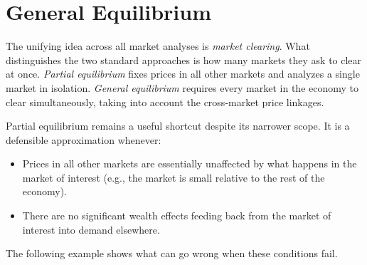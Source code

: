 \chapter{General Equilibrium}

The unifying idea across all market analyses is \emph{market clearing}.
What distinguishes the two standard approaches is how many markets
they ask to clear at once. \emph{Partial equilibrium} fixes prices in
all other markets and analyzes a single market in isolation.
\emph{General equilibrium} requires every market in the economy to
clear simultaneously, taking into account the cross-market price
linkages.

Partial equilibrium remains a useful shortcut despite its narrower
scope. It is a defensible approximation whenever:
\begin{itemize}
  \item
    Prices in all other markets are essentially unaffected by what
    happens in the market of interest (e.g., the market is small
    relative to the rest of the economy).
  \item
    There are no significant wealth effects feeding back from the
    market of interest into demand elsewhere.
  \end{itemize}

The following example shows what can go wrong when these conditions
fail.


